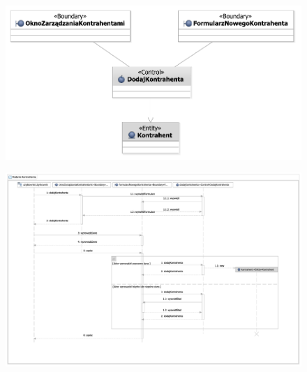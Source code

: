 \begin{figure}[H]
  \centering
  \includegraphics[angle=\ecbangle, scale=\ecbscale]{../img/usecase/pu9ecb.pdf}
  \caption{}
\end{figure}
\begin{figure}[H]
  \centering
  \includegraphics[angle=\seqangle, scale=\seqscalemin]{../img/usecase/pu9seq.pdf}
  \caption{}
\end{figure}
\newpage

